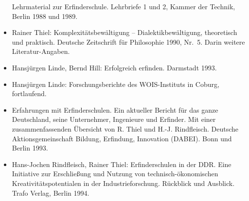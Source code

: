 \documentclass[11pt,a4paper]{article}
\begin{document}
\begin{itemize}
  Lehrmaterial zur Erfinderschule. Lehrbriefe 1 und 2, Kammer der Technik,
  Berlin 1988 und 1989.
\item Rainer Thiel: Komplexitätsbewältigung – Dialektikbewältigung, theoretisch
  und \linebreak praktisch.  Deutsche Zeitschrift für Philosophie 1990,
  Nr.~5. Darin weitere Literatur-Angaben.
\item Hansjürgen Linde, Bernd Hill: Erfolgreich erfinden. Darmstadt 1993.
\item Hansjürgen Linde: Forschungsberichte des WOIS-Instituts in Coburg,
  fortlaufend.
\item Erfahrungen mit Erfinderschulen. Ein aktueller Bericht für das ganze
  Deutschland, seine Unternehmer, Ingenieure und Erfinder. Mit einer
  zusammenfassenden Übersicht von R. Thiel und H.-J. Rindfleisch.  Deutsche
  Aktionsgemeinschaft Bildung, Erfindung, Innovation (DABEI).  Bonn und Berlin
  1993.
\item Hans-Jochen Rindfleisch, Rainer Thiel: Erfinderschulen in der DDR. Eine
  Initiative zur Erschließung und Nutzung von technisch-ökonomischen
  Kreativitätspotentialen in der Industrieforschung. Rückblick und Ausblick.
  Trafo Verlag, Berlin 1994.
\end{itemize}
\ccnotice
\end{document}
